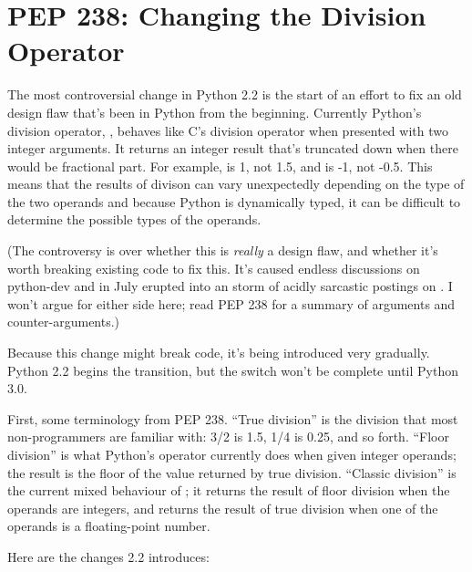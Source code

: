 \documentclass{howto}
\begin{document}
\section{PEP 238: Changing the Division Operator}

The most controversial change in Python 2.2 is the start of an effort
to fix an old design flaw that's been in Python from the beginning.
Currently Python's division operator, \code{/}, behaves like C's
division operator when presented with two integer arguments.  It
returns an integer result that's truncated down when there would be
fractional part.  For example,  is 1, not 1.5, and
 is -1, not -0.5.  This means that the results of divison
can vary unexpectedly depending on the type of the two operands and
because Python is dynamically typed, it can be difficult to determine
the possible types of the operands.

(The controversy is over whether this is \emph{really} a design flaw,
and whether it's worth breaking existing code to fix this.  It's
caused endless discussions on python-dev and in July erupted into an
storm of acidly sarcastic postings on . I
won't argue for either side here; read PEP 238 for a summary of
arguments and counter-arguments.)

Because this change might break code, it's being introduced very
gradually.  Python 2.2 begins the transition, but the switch won't be
complete until Python 3.0.

First, some terminology from PEP 238.  ``True division'' is the
division that most non-programmers are familiar with: 3/2 is 1.5, 1/4
is 0.25, and so forth.  ``Floor division'' is what Python's \code{/}
operator currently does when given integer operands; the result is the
floor of the value returned by true division.  ``Classic division'' is
the current mixed behaviour of \code{/}; it returns the result of
floor division when the operands are integers, and returns the result
of true division when one of the operands is a floating-point number.

Here are the changes 2.2 introduces:
\end{document}
